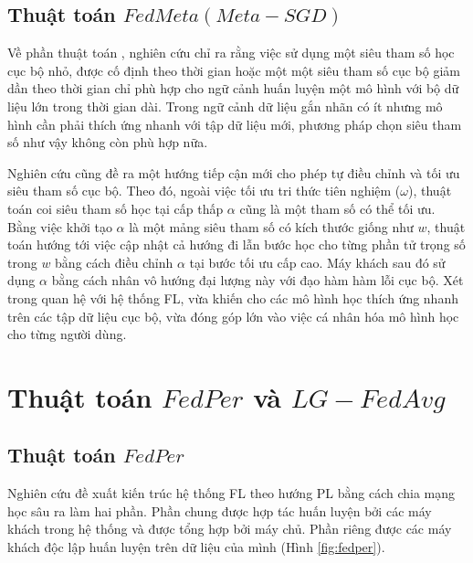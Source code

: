 \subsection{Thuật toán $FedMeta(Meta-SGD)$}

Về phần thuật toán , nghiên cứu \cite{li2017meta} chỉ ra rằng việc sử dụng một siêu tham số học cục bộ nhỏ, được cố định theo thời gian hoặc một một siêu tham số cục bộ giảm dần theo thời gian chỉ phù hợp cho ngữ cảnh huấn luyện một mô hình với bộ dữ liệu lớn trong thời gian dài. Trong ngữ cảnh dữ liệu gắn nhãn có ít nhưng mô hình cần phải thích ứng nhanh với tập dữ liệu mới, phương pháp chọn siêu tham số như vậy không còn phù hợp nữa.

Nghiên cứu cũng đề ra một hướng tiếp cận mới cho phép tự điều chỉnh và tối ưu siêu tham số cục bộ. Theo đó, ngoài việc tối ưu tri thức tiên nghiệm ($\omega$), thuật toán coi siêu tham số học tại cấp thấp $\alpha$ cũng là một tham số có thể tối ưu. Bằng việc khởi tạo $\alpha$ là một mảng siêu tham số có kích thước giống như $w$, thuật toán hướng tới việc cập nhật cả hướng đi lẫn bước học cho từng phần tử trọng số trong $w$ bằng cách điều chỉnh $\alpha$ tại bước tối ưu cấp cao. Máy khách sau đó sử dụng $\alpha$ bằng cách nhân vô hướng đại lượng này với đạo hàm hàm lỗi cục bộ. Xét trong quan hệ với hệ thống FL,  vừa khiến cho các mô hình học thích ứng nhanh trên các tập dữ liệu cục bộ, vừa đóng góp lớn vào việc cá nhân hóa mô hình học cho từng người dùng.

\section{Thuật toán $FedPer$ và $LG-FedAvg$}


\subsection{Thuật toán $FedPer$}

Nghiên cứu \cite{arivazhagan2019federated} đề xuất kiến trúc hệ thống FL theo hướng PL bằng cách chia mạng học sâu ra làm hai phần. Phần chung được hợp tác huấn luyện bởi các máy khách trong hệ thống và được tổng hợp bởi máy chủ. Phần riêng được các máy khách độc lập huấn luyện trên dữ liệu của mình (Hình \ref{fig:fedper}).

